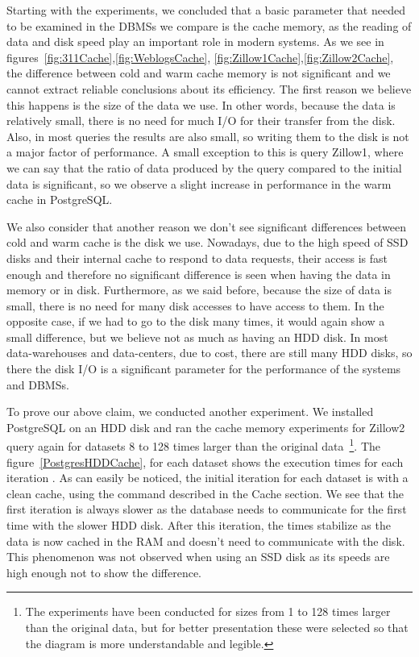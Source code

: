 Starting with the experiments, we concluded that a basic parameter that needed to be examined 
in the DBMSs we compare is the cache memory, as the reading of data and disk speed play an 
important role in modern systems. As we see in figures~\ref{fig:311Cache},\ref{fig:WeblogsCache},
\ref{fig:Zillow1Cache},\ref{fig:Zillow2Cache}, the difference between cold and warm 
cache memory is not significant and we cannot extract reliable conclusions about its efficiency. 
The first reason we believe this happens is the size of the data we use. In other words, 
because the data is relatively small, there is no need for much I/O for their transfer from 
the disk. Also, in most queries the results are also small, so writing them to the disk is 
not a major factor of performance. A small exception to this is query Zillow1, where we 
can say that the ratio of data produced by the query compared to the initial data is 
significant, so we observe a slight increase in performance in the warm cache in PostgreSQL.

We also consider that another reason we don't see significant differences between cold and 
warm cache is the disk we use. Nowadays, due to the high speed of SSD disks and their internal 
cache to respond to data requests, their access is fast enough and therefore no significant 
difference is seen when having the data in memory or in disk. Furthermore, as we said before, 
because the size of data is small, there is no need for many disk accesses to have access to 
them. In the opposite case, if we had to go to the disk many times, it would again show a 
small difference, but we believe not as much as having an HDD disk. In most data-warehouses 
and data-centers, due to cost, there are still many HDD disks, so there the disk I/O is a 
significant parameter for the performance of the systems and DBMSs.

To prove our above claim, we conducted another experiment. We installed PostgreSQL on an HDD 
disk and ran the cache memory experiments for Zillow2 query again for datasets 8 to 128 times 
larger than the original data~\footnote{The experiments have been conducted for sizes from 1 
to 128 times larger than the original data, but for better presentation these were selected so 
that the diagram is more understandable and legible.}. The figure~\ref{PostgresHDDCache}, for 
each dataset shows the execution times for each iteration . As can easily be noticed, the 
initial iteration for each dataset is with a clean cache, using the command described in 
the Cache section. We see that the first iteration is always slower as the database needs to 
communicate for the first time with the slower HDD disk. After this iteration, the times 
stabilize as the data is now cached in the RAM and doesn't need to communicate with the disk. 
This phenomenon was not observed when using an SSD disk as its speeds are high enough not to 
show the difference.


